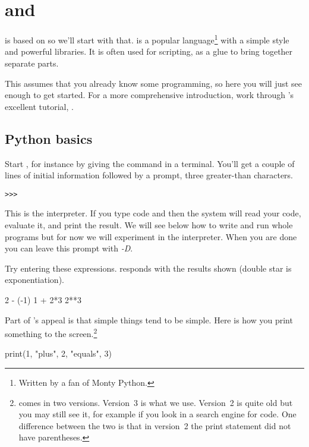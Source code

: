 \chapter{\python{} and \Sage{}}

\Sage{} is based on \python{} so we'll start with that.
\python{} is a popular language\footnote{Written by a fan of
Monty Python.} 
with a simple style and powerful libraries.
It is often used for scripting, as a glue to bring together separate parts.

This assumes 
that you already know some programming, so
here you will just see enough \python{} to get started. 
For a more comprehensive introduction, work through \python's excellent tutorial,
\cite{PythonTeam19b}.



\section{Python basics}
Start \python, for instance by giving the command
in a terminal.
You'll get a couple of lines of initial
information followed by a prompt, three greater-than
characters.
\begin{lstlisting}[style=python]
>>>   
\end{lstlisting}
This is the \python{} interpreter.
If you type 
\python{} code and  then the system
will read your code, evaluate it, and print the result.
We will see below how to write and run whole programs
but for now we will experiment in the interpreter.
When you are done you can 
leave this prompt with \textit{-D}.

Try entering these expressions.
\python{} responds with the results shown
(double star is exponentiation).
\begin{pythonconsole}
2 - (-1)
1 + 2*3
2**3  
\end{pythonconsole}

Part of \python's appeal is that simple things tend to be simple.
Here is how you print something to the screen.\footnote{%
  \protect\python{} comes in two versions.
  Version~3 is what we use.
  Version~2 is quite old but you may still see it, for example if
  you look in a search engine for code.
  One difference between the two is that in version~2 the
  print statement did not have parentheses.}
\begin{pythonconsole}
print(1, "plus", 2, "equals", 3)
\end{pythonconsole}

